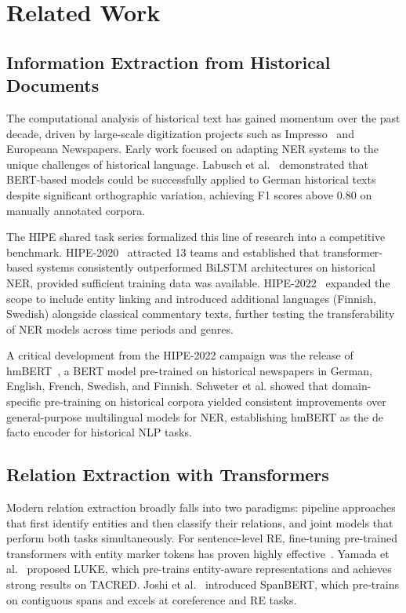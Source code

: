 \documentclass[11pt,a4paper]{article}
\begin{document}
\section{Related Work}
\label{sec:related}

\subsection{Information Extraction from Historical Documents}

The computational analysis of historical text has gained momentum over the past decade, driven by large-scale digitization projects such as Impresso~\cite{romanello2020} and Europeana Newspapers. Early work focused on adapting NER systems to the unique challenges of historical language. Labusch et al.~\cite{labusch2019} demonstrated that BERT-based models could be successfully applied to German historical texts despite significant orthographic variation, achieving F1 scores above 0.80 on manually annotated corpora.

The HIPE shared task series formalized this line of research into a competitive benchmark. HIPE-2020~\cite{ehrmann2020} attracted 13 teams and established that transformer-based systems consistently outperformed BiLSTM architectures on historical NER, provided sufficient training data was available. HIPE-2022~\cite{ehrmann2022} expanded the scope to include entity linking and introduced additional languages (Finnish, Swedish) alongside classical commentary texts, further testing the transferability of NER models across time periods and genres.

A critical development from the HIPE-2022 campaign was the release of hmBERT~\cite{schweter2022}, a BERT model pre-trained on historical newspapers in German, English, French, Swedish, and Finnish. Schweter et al. showed that domain-specific pre-training on historical corpora yielded consistent improvements over general-purpose multilingual models for NER, establishing hmBERT as the de facto encoder for historical NLP tasks.

\subsection{Relation Extraction with Transformers}

Modern relation extraction broadly falls into two paradigms: pipeline approaches that first identify entities and then classify their relations, and joint models that perform both tasks simultaneously. For sentence-level RE, fine-tuning pre-trained transformers with entity marker tokens has proven highly effective~\cite{soares2019}. Yamada et al.~\cite{yamada2020} proposed LUKE, which pre-trains entity-aware representations and achieves strong results on TACRED. Joshi et al.~\cite{joshi2020} introduced SpanBERT, which pre-trains on contiguous spans and excels at coreference and RE tasks.
\end{document}
